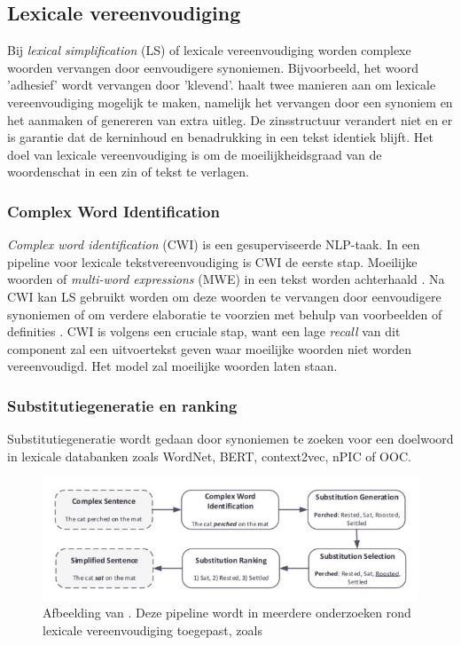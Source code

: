 \subsection{Lexicale vereenvoudiging}

Bij \textit{lexical simplification} (LS) of lexicale vereenvoudiging worden complexe woorden vervangen door eenvoudigere synoniemen. Bijvoorbeeld, het woord 'adhesief' wordt vervangen door 'klevend'. \textcite{Kandula2010} haalt twee manieren aan om lexicale vereenvoudiging mogelijk te maken, namelijk het vervangen door een synoniem en het aanmaken of genereren van extra uitleg. De zinsstructuur verandert niet en er is garantie dat de kerninhoud en benadrukking in een tekst identiek blijft. Het doel van lexicale vereenvoudiging is om de moeilijkheidsgraad van de woordenschat in een zin of tekst te verlagen. 

\subsubsection{Complex Word Identification}

\textit{Complex word identification} (CWI) is een gesuperviseerde NLP-taak. In een pipeline voor lexicale tekstvereenvoudiging is CWI de eerste stap. Moeilijke woorden of \textit{multi-word expressions} (MWE) in een tekst worden achterhaald  \autocite{Shardlow2013, Gooding2019}. Na CWI kan LS gebruikt worden om deze woorden te vervangen door eenvoudigere synoniemen of om verdere elaboratie te voorzien met behulp van voorbeelden of definities \autocite{Zeng2005, Kandula2010}. CWI is volgens \textcite{Shardlow2013} een cruciale stap, want een lage \textit{recall} van dit component zal een uitvoertekst geven waar moeilijke woorden niet worden vereenvoudigd. Het model zal moeilijke woorden laten staan.

\subsubsection{Substitutiegeneratie en ranking}
Substitutiegeneratie wordt gedaan door synoniemen te zoeken voor een doelwoord in lexicale databanken zoals WordNet, BERT, context2vec, nPIC of OOC. 
\begin{figure}[H]
	\includegraphics{img/lexical-simplification-pipeline.png}
	\caption{Afbeelding van \textcite{Althunayyan2021}. Deze pipeline wordt in meerdere onderzoeken rond lexicale vereenvoudiging toegepast, zoals \textcite{Paetzold2016, Bingel2018, Bulte2018}}
\end{figure}

